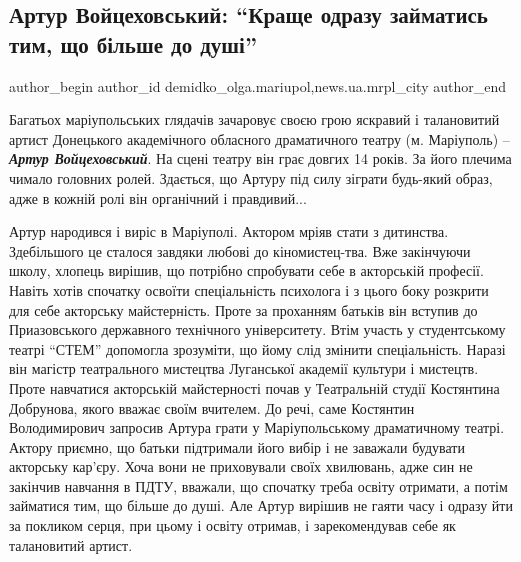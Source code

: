  
 
 
 
 
 
\subsection{Артур Войцеховський: \enquote{Краще одразу займатись тим, що більше до душі}}
\label{sec:21_09_2020.stz.news.ua.mrpl_city.1.artur_vojcehovskij}
 
\ifcmt
 author_begin
   author_id demidko_olga.mariupol,news.ua.mrpl_city
 author_end
\fi


Багатьох маріупольських глядачів зачаровує своєю грою яскравий і  талановитий
артист Донецького академічного обласного драматичного театру (м. Маріуполь) –
\emph{\textbf{Артур Войцеховський}}. На сцені театру він грає довгих 14 років. За його плечима
чимало головних ролей. Здається, що Артуру під силу зіграти будь-який образ,
адже в кожній ролі він органічний і правдивий...

Артур народився і виріс в Маріуполі. Актором мріяв стати з дитинства.
Здебільшого це сталося завдяки любові до кіномистец\hyp{}тва. Вже закінчуючи школу,
хлопець вирішив, що потрібно спробувати себе в акторській професії. Навіть
хотів спочатку освоїти спеціальність психолога і з цього боку розкрити для себе
акторську майстерність. Проте за проханням батьків  він вступив до
Приазовського державного технічного університету. Втім участь у студентському
театрі \enquote{СТЕМ} допомогла зрозуміти, що йому слід змінити спеціальність. Наразі
він магістр театрального мистецтва Луганської академії культури і мистецтв.
Проте навчатися акторській майстерності почав у Театральній студії Костянтина
Добрунова, якого вважає своїм вчителем. До речі, саме Костянтин Володимирович
запросив Артура грати у  Маріупольському драматичному театрі. Актору приємно,
що батьки підтримали його вибір і не заважали будувати акторську кар'єру. Хоча
вони не приховували своїх хвилювань, адже син не закінчив навчання в ПДТУ,
вважали, що спочатку треба освіту отримати, а потім займатися тим, що більше до
душі. Але Артур вирішив не гаяти часу і одразу йти за покликом серця, при цьому
і освіту отримав, і зарекомендував себе як талановитий артист.

